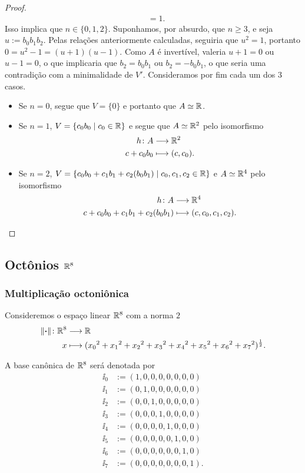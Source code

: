 \begin{proof}
\begin{align*}
		&= 1.
	\end{align*}
Isso implica que $n \in \{0,1,2\}$. Suponhamos, por absurdo, que $n\geq 3$, e seja $u := b_0b_1b_2$. Pelas relações anteriormente calculadas, seguiria que $u^2 = 1$, portanto $0 = u^2 - 1 = (u+1)(u-1)$. Como $A$ é invertível, valeria $u+1=0$ ou $u-1=0$, o que implicaria que $b_2=b_0b_1$ ou $b_2=-b_0b_1$, o que seria uma contradição com a minimalidade de $V'$.
Consideramos por fim cada um dos 3 casos.
\begin{itemize}
	\item Se $n=0$, segue que $V=\{0\}$ e portanto que $A \simeq \mathbb{R}$.
	\item Se $n=1$, $V=\left\{{c_0b_0}\;\middle\vert\;{c_0 \in \mathbb{R}}\right\}$ e segue que $A \simeq \mathbb{R}^2$ pelo isomorfismo
		\begin{align*}
		{h}\colon {A} &\longrightarrow {\mathbb{R}^2} \\{c+c_0b_0} &\longmapsto (c,c_0).
		\end{align*}
	\item Se $n=2$, $V=\left\{{c_0b_0 + c_1b_1 + c_2(b_0b_1)}\;\middle\vert\;{c_0,c_1,c_2 \in \mathbb{R}}\right\}$ e $A \simeq \mathbb{R}^4$ pelo isomorfismo
		\begin{align*}
		{h}\colon {A} &\longrightarrow {\mathbb{R}^4} \\{c+c_0b_0 + c_1b_1 + c_2(b_0b_1)} &\longmapsto (c,c_0,c_1,c_2).
		\end{align*}
\end{itemize}
\end{proof}





\subsection{Octônios \ensuremath{\R^8}}

\subsubsection{Multiplicação octoniônica}

Consideremos o espaço linear $\mathbb{R}^8$ com a norma $2$
	\begin{align*}
	{\left\Vert{\bm{\cdot}}\right\Vert}\colon {\mathbb{R}^8} &\longrightarrow {\mathbb{R}} \\{x} &\longmapsto ({x_0}^2+{x_1}^2+{x_2}^2+{x_3}^2+{x_4}^2+{x_5}^2+{x_6}^2+{x_7}^2)^{\frac{1}{2}}.
	\end{align*}

A base canônica de $\mathbb{R}^8$ será denotada por
	\begin{align*}
	\ii_0 &:= (1,0,0,0,0,0,0,0) \\
	\ii_1 &:= (0,1,0,0,0,0,0,0) \\
	\ii_2 &:= (0,0,1,0,0,0,0,0) \\
	\ii_3 &:= (0,0,0,1,0,0,0,0) \\
	\ii_4 &:= (0,0,0,0,1,0,0,0) \\
	\ii_5 &:= (0,0,0,0,0,1,0,0) \\
	\ii_6 &:= (0,0,0,0,0,0,1,0) \\
	\ii_7 &:= (0,0,0,0,0,0,0,1).
	\end{align*}

